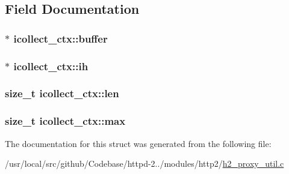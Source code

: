 \subsection{Field Documentation}
\subsubsection[{\texorpdfstring{buffer}{buffer}}]{$\ast$ icollect\+\_\+ctx\+::buffer}\hypertarget{structicollect__ctx_aa27f0a645c14ce0f113f7845a51ac5ca}{}\label{structicollect__ctx_aa27f0a645c14ce0f113f7845a51ac5ca}
\subsubsection[{\texorpdfstring{ih}{ih}}]{$\ast$ icollect\+\_\+ctx\+::ih}\hypertarget{structicollect__ctx_aac02420a629b2a9e7b735a23d8cca318}{}\label{structicollect__ctx_aac02420a629b2a9e7b735a23d8cca318}
\subsubsection[{\texorpdfstring{len}{len}}]{\setlength{\rightskip}{0pt plus 5cm}size\+\_\+t icollect\+\_\+ctx\+::len}\hypertarget{structicollect__ctx_aadf3d8c87d0bc6df4c99ad2ab45a88e4}{}\label{structicollect__ctx_aadf3d8c87d0bc6df4c99ad2ab45a88e4}
\subsubsection[{\texorpdfstring{max}{max}}]{\setlength{\rightskip}{0pt plus 5cm}size\+\_\+t icollect\+\_\+ctx\+::max}\hypertarget{structicollect__ctx_a1c1ea1d6b2568d8ff1a6573ea28dd68f}{}\label{structicollect__ctx_a1c1ea1d6b2568d8ff1a6573ea28dd68f}


The documentation for this struct was generated from the following file\+:\begin{DoxyCompactItemize}
\item 
/usr/local/src/github/\+Codebase/httpd-\/2../modules/http2/\hyperlink{h2__proxy__util_8c}{h2\+\_\+proxy\+\_\+util.\+c}\end{DoxyCompactItemize}

